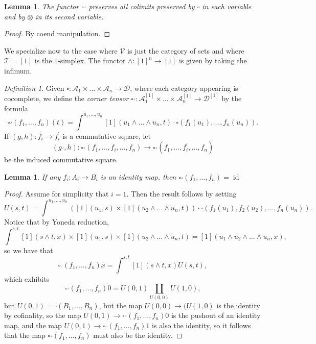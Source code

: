 \documentclass{amsart}
\numberwithin{equation}{section}
\theoremstyle{plain}   %
\newtheorem{lemma}[subsection]{Lemma}
\theoremstyle{remark}
\newtheorem{defn}[subsection]{Definition}
\theoremstyle{plain}
\DeclareMathOperator{\id}{id}
\begin{document}
\begin{lemma}
	The functor \(\square^\lrcorner\) preserves all colimits preserved by \(\square\) in each variable and by \(\otimes\) in its second variable.  
\end{lemma}
\begin{proof} By coend manipulation.
\end{proof}
We specialize now to the case where \(\mathcal{V}\) is just the category of sets and where \(\mathcal{T}=[1]\) is the \(1\)-simplex.  The functor \(\wedge:[1]^n \to [1]\) is given by taking the infimum.   
\begin{defn}
	Given \(\square:\mathcal{A}_1\times \dots \times \mathcal{A}_n \to \mathcal{D}\), where each category appearing is cocomplete, we define the \emph{corner tensor} \(\square^\lrcorner:\mathcal{A}_1^{[1]}\times \dots \times \mathcal{A}_n^{[1]} \to \mathcal{D}^{[1]}\) by the formula
	\[\square^\lrcorner(f_1,\dots,f_n)(t)=\int^{u_1,\dots,u_n} [1](u_1\wedge\dots\wedge u_n, t) \cdot \square(f_1(u_1),\dots,f_n(u_n)).\]
	If \((g,h): f_i\to f^\prime_i\) is a commutative square, let 
	\[(g^\lrcorner,h):\square^\lrcorner(f_1,\dots,f_i,\dots,f_n) \to \square^\lrcorner(f_1,\dots,f^\prime_i,\dots,f_n) \]
	be the induced commutative square.  
\end{defn}
\begin{lemma}\label{corneridentities}
	If any \(f_i:A_i\to B_i\) is an identity map, then \(\square^\lrcorner(f_1,\dots,f_n)=\id\)
\end{lemma}
\begin{proof}
	Assume for simplicity that \(i=1\).  Then the result follows by setting 
	\[U(s,t)=\int^{u_1,\dots,u_n} \left([1](u_1,s) \times [1](u_2\wedge\dots\wedge u_n,t)\right)\cdot \square(f_1(u_1),f_2(u_2),\dots, f_n(u_n)).\]
	Notice that by Yoneda reduction,
	\[\int^{s,t} [1](s\wedge t,x) \times [1](u_1,s) \times [1](u_2\wedge\dots\wedge u_n,t) = [1](u_1 \wedge u_2 \wedge \dots\wedge u_n,x),\]
	so we have that 
	\[\square^\lrcorner(f_1,\dots,f_n)x=\int^{s,t} [1](s\wedge t,x) U(s,t),\]
	which exhibits 
	\[\square^\lrcorner(f_1,\dots,f_n)0=U(0,1)\coprod_{U(0,0)} U(1,0),\]
	but \(U(0,1)=\square(B_1,\dots,B_n)\), but the map \(U(0,0) \to (U(1,0)\) is the identity by cofinality, so the map \(U(0,1) \to \square^\lrcorner(f_1,\dots,f_n)0\) is the pushout of an identity map, and the map \(U(0,1)\to \square^\lrcorner(f_1,\dots,f_n)1\) is also the identity, so it follows that the map \(\square^\lrcorner(f_1,\dots,f_n)\) must also be the identity.
\end{proof}
\end{document}

